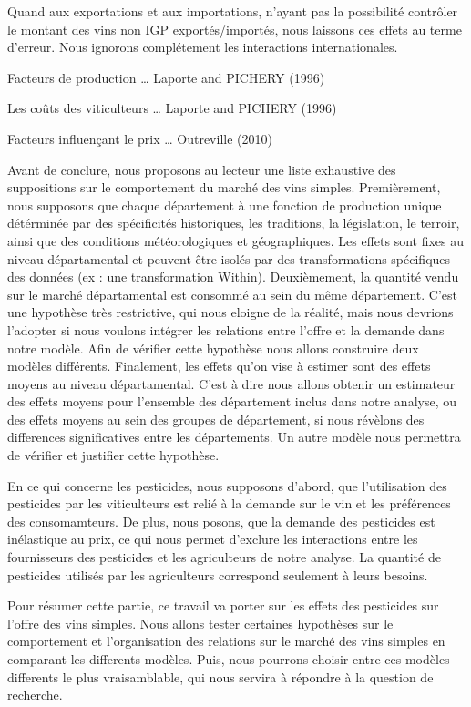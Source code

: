 \documentclass[11pt,]{article}
\begin{document}
Quand aux exportations et aux importations, n'ayant pas la possibilité
contrôler le montant des vins non IGP exportés/importés, nous laissons
ces effets au terme d'erreur. Nous ignorons complétement les
interactions internationales.

Facteurs de production \ldots{} Laporte and PICHERY (1996)

Les coûts des viticulteurs \ldots{} Laporte and PICHERY (1996)

Facteurs influençant le prix \ldots{} Outreville (2010)

Avant de conclure, nous proposons au lecteur une liste exhaustive des
suppositions sur le comportement du marché des vins simples.
Premièrement, nous supposons que chaque département à une fonction de
production unique détérminée par des spécificités historiques, les
traditions, la législation, le terroir, ainsi que des conditions
météorologiques et géographiques. Les effets sont fixes au niveau
départamental et peuvent être isolés par des transformations spécifiques
des données (ex : une transformation Within). Deuxièmement, la quantité
vendu sur le marché départamental est consommé au sein du même
département. C'est une hypothèse très restrictive, qui nous eloigne de
la réalité, mais nous devrions l'adopter si nous voulons intégrer les
relations entre l'offre et la demande dans notre modèle. Afin de
vérifier cette hypothèse nous allons construire deux modèles différents.
Finalement, les effets qu'on vise à estimer sont des effets moyens au
niveau départamental. C'est à dire nous allons obtenir un estimateur des
effets moyens pour l'ensemble des département inclus dans notre analyse,
ou des effets moyens au sein des groupes de département, si nous
révèlons des differences significatives entre les départements. Un autre
modèle nous permettra de vérifier et justifier cette hypothèse.

En ce qui concerne les pesticides, nous supposons d'abord, que
l'utilisation des pesticides par les viticulteurs est relié à la demande
sur le vin et les préférences des consomamteurs. De plus, nous posons,
que la demande des pesticides est inélastique au prix, ce qui nous
permet d'exclure les interactions entre les fournisseurs des pesticides
et les agriculteurs de notre analyse. La quantité de pesticides utilisés
par les agriculteurs correspond seulement à leurs besoins.

Pour résumer cette partie, ce travail va porter sur les effets des
pesticides sur l'offre des vins simples. Nous allons tester certaines
hypothèses sur le comportement et l'organisation des relations sur le
marché des vins simples en comparant les differents modèles. Puis, nous
pourrons choisir entre ces modèles differents le plus vraisamblable, qui
nous servira à répondre à la question de recherche.
\end{document}
